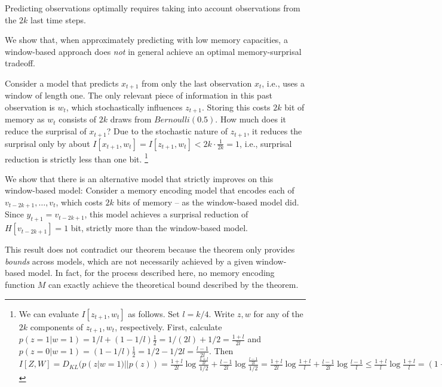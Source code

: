 \documentclass[11pt,letterpaper]{article}
\newcounter{theorem}
\begin{document}
Predicting observations optimally requires taking into account observations from the $2k$ last time steps.

We show that, when approximately predicting with low memory capacities, a window-based approach does \emph{not} in general achieve an optimal memory-surprisal tradeoff.

Consider a model that predicts $x_{t+1}$ from only the last observation $x_t$, i.e., uses a window of length one.
The only relevant piece of information in this past observation is $w_t$, which stochastically influences $z_{t+1}$.
Storing this costs $2k$ bit of memory as $w_t$ consists of $2k$ draws from $Bernoulli(0.5)$.
How much does it reduce the surprisal of $x_{t+1}$?
Due to the stochastic nature of $z_{t+1}$, it reduces the surprisal only by about $I[x_{t+1}, w_t] = I[z_{t+1}, w_t] < 2k \cdot \frac{1}{2k} = 1$, i.e., surprisal reduction is strictly less than one bit.
\footnote{We can evaluate $I[z_{t+1}, w_t]$ as follows. Set $l = k/4$. Write $z, w$ for any of the $2k$ components of $z_{t+1}, w_t$, respectively. First, calculate $p(z = 1|w=1) = 1/l + (1-1/l) \frac{1}{2} = 1/(2l) + 1/2 = \frac{1+l}{2l}$ and $p(z = 0|w=1) = (1-1/l) \frac{1}{2} = 1/2 - 1/2l = \frac{l-1}{2l}$.
Then $I[Z, W] = D_{KL}(p(z|w=1)||p(z)) = \frac{1+l}{2l} \log \frac{\frac{1+l}{2l}}{1/2} + \frac{l-1}{2l} \log \frac{\frac{l-1}{2l}}{1/2}  = \frac{1+l}{2l} \log \frac{1+l}{l} + \frac{l-1}{2l} \log \frac{l-1}{l}  \leq \frac{1+l}{l} \log \frac{1+l}{l} =  (1+1/l) \log (1+1/l)  \leq  (1+1/l) (1/l) = 1/l + 1/l^2 < 2/l = \frac{1}{2k}.$
}

We show that there is an alternative model that strictly improves on this window-based model:
Consider a memory encoding model that encodes each of $v_{t-2k+1}, \dots, v_{t}$, which costs $2k$ bits of memory -- as the window-based model did.
Since $y_{t+1} = v_{t-2k+1}$, this model achieves a surprisal reduction of $H[v_{t-2k+1}] = 1$ bit, strictly more than the window-based model.


This result does not contradict our theorem because the theorem only provides \emph{bounds} across models, which are not necessarily achieved by a given window-based model.
In fact, for the process described here, no memory encoding function $M$ can exactly achieve the theoretical bound described by the theorem.
\end{document}
